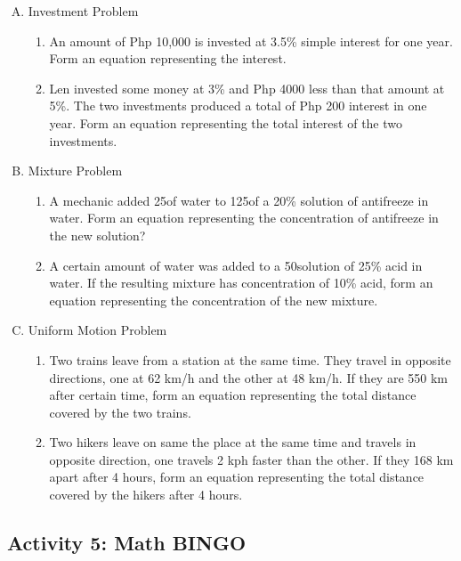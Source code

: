 \begin{enumerate}[A.]
\item Investment Problem
	\begin{enumerate}
	\item An amount of Php 10,000 is invested at 3.5\% simple interest for one year. Form an equation representing the interest.
	\item Len invested some money at 3\% and Php 4000 less than that amount at 5\%. The two investments produced a total of Php 200 interest in one year. Form an equation representing the total interest of the two investments.
	\end{enumerate}
\item Mixture Problem
	\begin{enumerate}
	\item A mechanic added 25\mL of water to 125\mL of a 20\% solution of antifreeze in water. Form an equation representing the concentration of antifreeze in the new solution?
	\item A certain amount of water was added to a 50\mL solution of 25\% acid in water. If the resulting mixture has concentration of 10\% acid, form an
equation representing the concentration of the new
mixture.
	\end{enumerate}
\item Uniform Motion Problem
	\begin{enumerate}
	\item Two trains leave from a station at the same time. They travel in opposite directions, one at 62 km/h and the other at 48 km/h. If they are 550 km after certain time, form an equation representing the total distance covered by the two trains.
	\item Two hikers leave on same the place at the same time and travels in opposite direction, one travels 2 kph faster than the other. If they 168 km apart after 4 hours, form an equation representing the total distance covered by the hikers after 4 hours.
	\end{enumerate}
\end{enumerate}
\subsection*{Activity 5: Math BINGO}\label{chap5sec:1}
